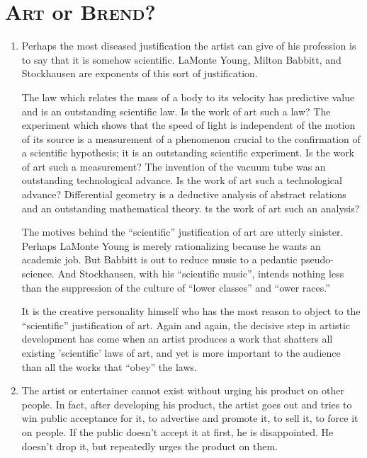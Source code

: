 \chapter{\textsc{Art} or \textsc{Brend}?}

\begin{enumerate}[label=\textbf{\arabic*.}, wide, itemsep=1em]
\item Perhaps the most diseased justification the artist can give of his profession is to say that it is somehow scientific. LaMonte Young, Milton Babbitt, and Stockhausen are exponents of this sort of justification. 

The law which relates the mass of a body to its velocity has predictive value and is an outstanding scientific law. Is the work of art such a law? The experiment which shows that the speed of light is independent of the motion of its source is a measurement of a phenomenon crucial to the confirmation of a scientific hypothesis; it is an outstanding scientific experiment. Is the work of art such a measurement? The invention of the vacuum tube was an outstanding technological advance. Is the work of art such a technological advance? Differential geometry is a deductive analysis of abstract relations and an outstanding mathematical theory. ts the work of art such an analysis? 

The motives behind the \enquote{scientific} justification of art are utterly sinister. Perhaps LaMonte Young is merely rationalizing because he wants an academic job. But Babbitt is out to reduce music to a pedantic pseudo-science. And Stockhausen, with his \enquote{scientific music}, intends nothing less than the suppression of the culture of \enquote{lower classes} and \enquote{ower races.} 

It is the creative personality himself who has the most reason to object to the \enquote{scientific} justification of art. Again and again, the decisive step in artistic development has come when an artist produces a work that shatters all existing 'scientific' laws of art, and yet is more important to the audience than all the works that \enquote{obey} the laws. 

\item The artist or entertainer cannot exist without urging his product on other people. In fact, after developing his product, the artist goes out and tries to win public acceptance for it, to advertise and promote it, to sell it, to force it on people. If the public doesn't accept it at first, he is disappointed. He doesn't drop it, but repeatedly urges the product on them. 


\end{enumerate}

